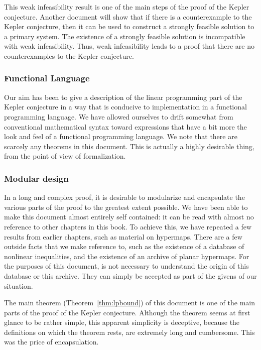 This weak infeasibility result is one of the main steps of the
proof of the Kepler conjecture.  Another document will show that
if there is a counterexample to the Kepler conjecture, then it can
be used to construct a strongly feasible solution to a primary
system.  The existence of a strongly feasible solution is
incompatible with weak infeasibility.  Thus, weak infeasibility
leads to a proof that there are no counterexamples to the Kepler
conjecture.

\subsubsection{Functional Language}

Our aim has been to give a description of the linear programming
part of the Kepler conjecture in a way that is conducive to
implementation in a functional programming language.  We have
allowed ourselves to drift somewhat from conventional mathematical
syntax toward expressions that have a bit more the look and feel
of a functional programming language.  We note that there are
scarcely any theorems in this document.  This is actually a highly
desirable thing, from the point of view of formalization.

\subsubsection{Modular design}

In a long and complex proof, it is desirable to modularize and
encapsulate the various parts of the proof to the greatest extent
possible.  We have been able to make this document almost entirely
self contained: it can be read with almost no reference to other
chapters in this book.  To achieve this, we have repeated a few
results from earlier chapters, such as material on hypermaps.
There are a few outside facts that we make reference to, such as
the existence of a database of nonlinear inequalities, and the
existence of an archive of planar hypermaps.  For the purposes of
this document, is not necessary to understand the origin of this
database or this archive. They can simply be accepted as part of
the givens of our situation.

The main theorem (Theorem~\ref{thm:lpbound}) of this document is
one of the main parts of the proof of the Kepler conjecture.
Although the theorem seems at first glance to be rather simple,
this apparent simplicity is deceptive, because the definitions on
which the theorem rests, are extremely long and cumbersome.  This
was the price of encapsulation.

